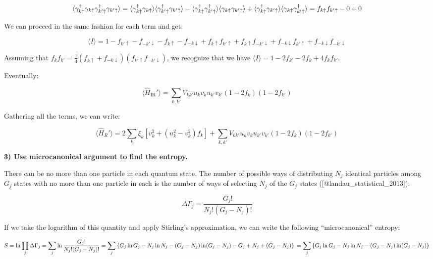\[\langle \gamma_{k\uparrow}^\dagger \gamma_{k\uparrow}\gamma_{k'\uparrow}^\dagger\gamma_{k'\uparrow} \rangle = \langle  \gamma_{k\uparrow}^\dagger \gamma_{k\uparrow} \rangle\langle \gamma_{k'\uparrow}^\dagger \gamma_{k'\uparrow} \rangle 
- \langle \gamma_{k\uparrow}^\dagger\gamma_{k'\uparrow}^\dagger \rangle \langle \gamma_{k\uparrow}\gamma_{k'\uparrow}\rangle 
+ \langle \gamma_{k\uparrow}^\dagger \gamma_{k'\uparrow}\rangle \langle \gamma_{k\uparrow}\gamma_{k'\uparrow}^\dagger \rangle
\\ = f_{k\uparrow}f_{k'\uparrow} - 0 + 0 \]

We can proceed in the same fashion for each term and get:

\[\langle I \rangle = 1 -f_{k'\uparrow} -f_{-k'\downarrow} - f_{k\uparrow} - f_{-k\downarrow} + f_{k\uparrow}f_{k'\uparrow} + f_{k\uparrow}f_{-k'\downarrow}+f_{-k\downarrow}f_{k'\uparrow}+f_{-k\downarrow}f_{-k'\downarrow}\]

Assuming that
\(f_k f_{k'} = \frac{1}{4}(f_{k\uparrow}+f_{-k\downarrow})(f_{k'\uparrow}f_{-k'\downarrow})\),
we recognize that we have
\(\langle I \rangle = 1 - 2f_{k'}-2f_k + 4f_kf_{k'}\).

Eventually:

\[\langle \hat{H}_{\textrm{IR}}' \rangle = \sum_{k,k'} V_{kk'} u_k v_k u_{k'}v_{k'}(1-2f_k)(1-2f_{k'})\]

Gathering all the terms, we can write:

\[\langle \hat{H}_R' \rangle = 2\sum_k \xi_k[v_k^2 + (u_k^2 - v_k^2)f_k] + \sum_{k,k'} V_{kk'}u_k v_k u_{k'}v_{k'}(1-2f_k)(1-2f_{k'})\]

\textbf{3) Use microcanonical argument to find the entropy.}

There can be no more than one particle in each quantum state. The number
of possible ways of distributing \(N_j\) identical particles among
\(G_j\) states with no more than one particle in each is the number of
ways of selecting \(N_j\) of the \(G_j\) states
({[}@landau\_statistical\_2013{]}):

\[ \Delta \Gamma_j = \frac{G_j !}{N_j!(G_j - N_j)!}\]

If we take the logarithm of this quantity and apply Stirling's
approximation, we can write the following ``microcanonical'' entropy:

\[S = \ln \prod_j \Delta \Gamma_j \\ = \sum_j \ln \frac{G_j !}{N_j!(G_j - N_j)!} = \sum_j \left\{G_j \ln G_j - N_j \ln N_j -(G_j - N_j)\ln(G_j - N_j)-G_j + N_j + (G_j - N_j)  \right\} \\ = \sum_j \left\{G_j \ln G_j - N_j \ln N_j -(G_j - N_j)\ln(G_j - N_j) \right\}\]

